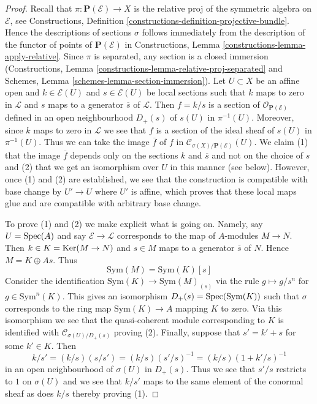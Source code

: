\begin{proof}
Recall that $\pi : \mathbf{P}(\mathcal{E}) \to X$ is the relative proj of the
symmetric algebra on $\mathcal{E}$, see
Constructions, Definition \ref{constructions-definition-projective-bundle}.
Hence the descriptions of sections $\sigma$ follows immediately from
the description of the functor of points of $\mathbf{P}(\mathcal{E})$
in Constructions, Lemma \ref{constructions-lemma-apply-relative}.
Since $\pi$ is separated, any section is a closed immersion
(Constructions, Lemma \ref{constructions-lemma-relative-proj-separated} and
Schemes, Lemma \ref{schemes-lemma-section-immersion}).
Let $U \subset X$ be an affine open and $k \in \mathcal{E}(U)$ and
$s \in \mathcal{E}(U)$ be local sections such that $k$ maps to
zero in $\mathcal{L}$ and $s$ maps to a generator $\overline{s}$
of $\mathcal{L}$.
Then $f = k/s$ is a section of $\mathcal{O}_{\mathbf{P}(\mathcal{E})}$
defined in an open neighbourhood $D_+(s)$ of $s(U)$ in $\pi^{-1}(U)$.
Moreover, since $k$ maps to zero in $\mathcal{L}$ we see that
$f$ is a section of the ideal sheaf of $s(U)$ in $\pi^{-1}(U)$.
Thus we can take the image $\overline{f}$ of $f$ in
$\mathcal{C}_{\sigma(X)/\mathbf{P}(\mathcal{E})}(U)$.
We claim (1) that the image $\overline{f}$ depends only on the
sections $k$ and $\overline{s}$ and not on the choice of $s$
and (2) that we get an isomorphism over $U$ in this manner (see below).
However, once (1) and (2) are established, we see that
the construction is compatible with base change by $U' \to U$
where $U'$ is affine, which proves that these local maps glue
and are compatible with arbitrary base change.

\medskip\noindent
To prove (1) and (2) we make explicit what is going on.
Namely, say $U = \mathop{\mathrm{Spec}}(A)$ and say $\mathcal{E} \to \mathcal{L}$
corresponds to the map of $A$-modules $M \to N$. Then
$k \in K = \mathop{\mathrm{Ker}}(M \to N)$ and $s \in M$ maps to a generator $\overline{s}$
of $N$. Hence $M = K \oplus A s$. Thus
$$
\text{Sym}(M) = \text{Sym}(K)[s]
$$
Consider the identification $\text{Sym}(K) \to \text{Sym}(M)_{(s)}$
via the rule $g \mapsto g/s^n$ for $g \in \text{Sym}^n(K)$.
This gives an isomorphism $D_+(s) = \mathop{\mathrm{Spec}}(\text{Sym}(K))$ such
that $\sigma$ corresponds to the ring map $\text{Sym}(K) \to A$
mapping $K$ to zero. Via this isomorphism we see that the quasi-coherent
module corresponding to $K$ is identified with
$\mathcal{C}_{\sigma(U)/D_+(s)}$ proving (2).
Finally, suppose that $s' = k' + s$ for some $k' \in K$.
Then
$$
k/s' = (k/s) (s/s') = (k/s) (s'/s)^{-1} = (k/s) (1 + k'/s)^{-1}
$$
in an open neighbourhood of $\sigma(U)$ in $D_+(s)$. Thus we see that
$s'/s$ restricts to $1$ on $\sigma(U)$ and we see that $k/s'$ maps to
the same element of the conormal sheaf as does $k/s$ thereby proving (1).
\end{proof}





